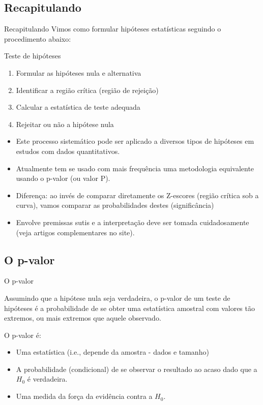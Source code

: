 \documentclass{beamer}
\begin{document}
\subsection{Recapitulando}

\begin{frame}{Recapitulando}
  Vimos como formular hipóteses estatísticas seguindo o procedimento
  abaixo:
  \begin{block}{Teste de hipóteses}
    \begin{enumerate}
    \item Formular as hipóteses nula e alternativa
    \item Identificar a região crítica (região de rejeição)
    \item Calcular a estatística de teste adequada
    \item Rejeitar ou não a hipótese nula
    \end{enumerate}
  \end{block}
\end{frame}

\begin{frame}{}
  \begin{itemize}
  \item Este processo sistemático pode ser aplicado a diversos tipos
    de hipóteses em estudos com dados quantitativos.
  \item Atualmente tem se usado com mais frequência uma metodologia
    equivalente usando o \alert{p-valor} (ou valor P).
  \item Diferença: ao invés de comparar diretamente os Z-escores
    (região crítica sob a curva), vamos comparar as probabilidades
    destes (significância)
  \item Envolve premissas sutis e a interpretação deve ser tomada
    cuidadosamente (veja artigos complementares no site).
  \end{itemize}
\end{frame}


\subsection{O p-valor}

\begin{frame}{O p-valor}
  \begin{definition}
    Assumindo que a hipótese nula seja verdadeira, o \alert{p-valor}
    de um teste de hipóteses é a probabilidade de se obter uma
    estatística amostral com valores tão extremos, ou mais extremos
    que aquele observado.
  \end{definition}

O p-valor \alert{é}:
  \begin{itemize}
  \item Uma estatística (i.e., depende da amostra - dados e tamanho)
  \item A probabilidade (condicional) de se observar o resultado ao
    acaso \alert{dado que} a $H_0$ é verdadeira.
  \item Uma medida da força da evidência contra a $H_0$.
  \end{itemize}
\end{frame}
\end{document}
